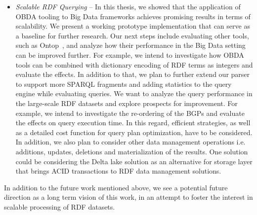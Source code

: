 \begin{itemize}
    \item \textit{Scalable \gls{RDF} Querying} -- 
    In this thesis, we showed that the application of OBDA tooling to Big Data frameworks achieves promising results in terms of scalability. 
    We present a working prototype implementation that can serve as a baseline for further research. 
    Our next steps include evaluating other tools, such as Ontop~\cite{Calvanese2017OntopAS}, and analyze how their performance in the Big Data setting can be improved further. 
    For example, we intend to investigate how OBDA tools can be combined with dictionary encoding of \gls{RDF} terms as integers and evaluate the effects.
    In addition to that, we plan to further extend our parser to support more \gls{SPARQL} fragments and adding statistics to the query engine while evaluating queries. 
    We want to analyze the query performance in the large-scale \gls{RDF} datasets and explore prospects for improvement.
    For example, we intend to investigate the re-ordering of the \gls{BGP}s and evaluate the effects on query execution time.
    In this regard, efficient strategies, as well as a detailed cost function for query plan optimization, have to be considered.
    In addition, we also plan to consider other data management operations i.e. additions, updates, deletions and materialization of the results.
    One solution could be considering the Delta lake solution as an alternative for storage layer that brings ACID transactions to \gls{RDF} data management solutions.
\end{itemize}

In addition to the future work mentioned above, we see a potential future direction as a long term vision of this work, in an
attempt to foster the interest in scalable processing of \gls{RDF} datasets.


